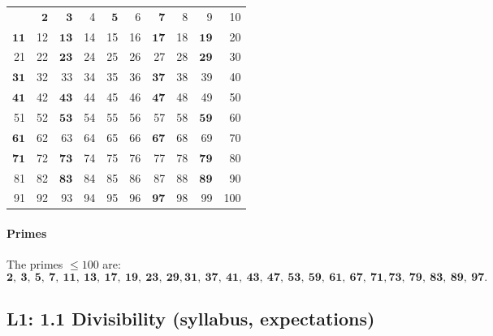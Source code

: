 \documentclass[10pt]{article}
\theoremstyle{definition}
\theoremstyle{plain}
\numberwithin{equation}{section}
\begin{document}
\bigskip
\begin{center}
\renewcommand{\arraystretch}{1.15}
\begin{tabular}{*{10}{r}}
   & \(\mathbf{2}\) & \(\mathbf{3}\) & 4 & \(\mathbf{5}\) & 6 & \(\mathbf{7}\) & 8 & 9 & 10 \\
 \(\mathbf{11}\) & 12 & \(\mathbf{13}\) & 14 & 15 & 16 & \(\mathbf{17}\) & 18 & \(\mathbf{19}\) & 20 \\
 21 & 22 & \(\mathbf{23}\) & 24 & 25 & 26 & 27 & 28 & \(\mathbf{29}\) & 30 \\
 \(\mathbf{31}\) & 32 & 33 & 34 & 35 & 36 & \(\mathbf{37}\) & 38 & 39 & 40 \\
 \(\mathbf{41}\) & 42 & \(\mathbf{43}\) & 44 & 45 & 46 & \(\mathbf{47}\) & 48 & 49 & 50 \\
 51 & 52 & \(\mathbf{53}\) & 54 & 55 & 56 & 57 & 58 & \(\mathbf{59}\) & 60 \\
 \(\mathbf{61}\) & 62 & 63 & 64 & 65 & 66 & \(\mathbf{67}\) & 68 & 69 & 70 \\
 \(\mathbf{71}\) & 72 & \(\mathbf{73}\) & 74 & 75 & 76 & 77 & 78 & \(\mathbf{79}\) & 80 \\
 81 & 82 & \(\mathbf{83}\) & 84 & 85 & 86 & 87 & 88 & \(\mathbf{89}\) & 90 \\
 91 & 92 & 93 & 94 & 95 & 96 & \(\mathbf{97}\) & 98 & 99 & 100 \\
\end{tabular}
\end{center}

\bigskip
\paragraph{Primes } The primes \(\le 100\) are:
\[
\mathbf{2},\ \mathbf{3},\ \mathbf{5},\ \mathbf{7},\ \mathbf{11},\ \mathbf{13},\ \mathbf{17},\ \mathbf{19},\ \mathbf{23},\ \mathbf{29},
\mathbf{31},\ \mathbf{37},\ \mathbf{41},\ \mathbf{43},\ \mathbf{47},\ \mathbf{53},\ \mathbf{59},\ \mathbf{61},\ \mathbf{67},\ \mathbf{71},
\mathbf{73},\ \mathbf{79},\ \mathbf{83},\ \mathbf{89},\ \mathbf{97}.
\]









\newpage
\subsection{L1: 1.1 Divisibility (syllabus, expectations)}
\end{document}
